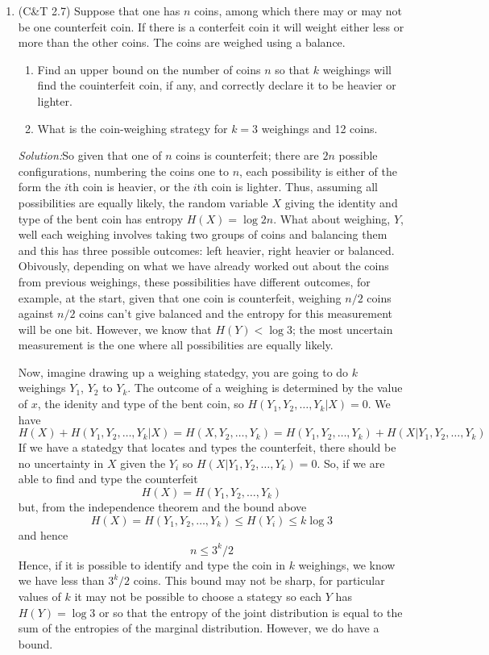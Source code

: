 \documentclass[12pt]{article}
\newcommand{\soln}{\noindent\textit{Solution:}}
\begin{document}
\begin{enumerate}
\item (C\&T 2.7) Suppose that one has $n$ coins, among which there may or may not be one counterfeit coin. If there is a conterfeit coin it will weight either less or more than the other coins. The coins are weighed using a balance.
\begin{enumerate}
\item Find an upper bound on the number of coins $n$ so that $k$ weighings will find the couinterfeit coin, if any, and correctly declare it to be heavier or lighter.
\item What is the coin-weighing strategy for $k=3$ weighings and 12 coins.
\end{enumerate}

\soln So given that one of $n$ coins is counterfeit; there are $2n$
possible configurations, numbering the coins one to $n$, each
possibility is either of the form the $i$th coin is heavier, or the
$i$th coin is lighter. Thus, assuming all possibilities are equally
likely, the random variable $X$ giving the identity and type of the
bent coin has entropy $H(X)=\log{2n}$. What about weighing, $Y$, well
each weighing involves taking two groups of coins and balancing them
and this has three possible outcomes: left heavier, right heavier or
balanced. Obivously, depending on what we have already worked out
about the coins from previous weighings, these possibilities have
different outcomes, for example, at the start, given that one coin is
counterfeit, weighing $n/2$ coins against $n/2$ coins can't give
balanced and the entropy for this measurement will be one
bit. However, we know that $H(Y)<\log{3}$; the most uncertain
measurement is the one where all possibilities are equally likely.

Now, imagine drawing up a weighing statedgy, you are going to do $k$
weighings $Y_1$, $Y_2$ to $Y_k$. The outcome of a weighing is determined by the value of
$x$, the idenity and type of the bent coin, so $H(Y_1,Y_2,\ldots, Y_k|X)=0$. We have
\begin{equation}
H(X)+H(Y_1,Y_2,\ldots, Y_k|X)=H(X,Y_2,\ldots, Y_k)=H(Y_1,Y_2,\ldots,Y_k)+H(X|Y_1,Y_2,\ldots,Y_k)
\end{equation}
If we have a statedgy that locates and types the counterfeit, there should be no uncertainty in $X$ given the $Y_i$ so 
$H(X|Y_1,Y_2,\ldots,Y_k)=0$. So, if we are able to find and type the counterfeit
\begin{equation}
H(X)=H(Y_1,Y_2,\ldots,Y_k)
\end{equation}
but, from the independence theorem and the bound above
\begin{equation}
H(X)=H(Y_1,Y_2,\ldots,Y_k)\le H(Y_i)\le k\log{3}
\end{equation}
and hence
\begin{equation}
n\le 3^{k}/2
\end{equation}
Hence, if it is possible to identify and type the coin in $k$ weighings, we know we have less than $3^k/2$ coins. This bound may not be sharp, for particular values of $k$ it may not be possible to choose a stategy so each $Y$ has $H(Y)=\log{3}$ or so that the entropy of the joint distribution is equal to the sum of the entropies of the marginal distribution. However, we do have a bound.


\end{enumerate}
\end{document}
